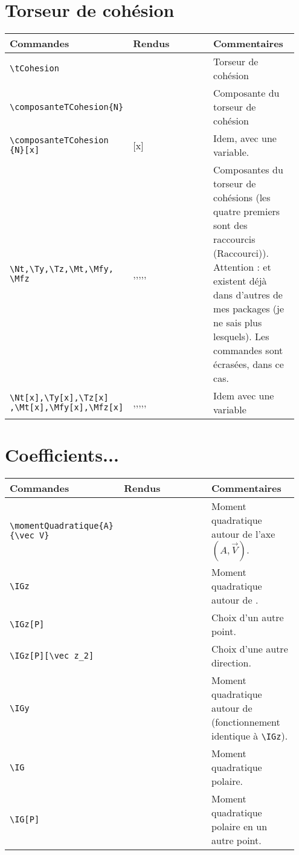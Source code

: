 \documentclass[a4paper,10pt]{article}
\newcommand{\rac}{({\color{red}Raccourci})}
\begin{document}
	\section{Torseur de cohésion}
	\noindent
	\begin{tabular}{|p{0.35\linewidth}|p{0.3\linewidth}|p{0.3\linewidth}|}
		\hline
			\textbf{Commandes}&\textbf{Rendus}&\textbf{Commentaires}
		\\\hline\hline
			\verb!\tCohesion!		&	\tCohesion		&	Torseur de cohésion
		\\\hline
			\verb!\composanteTCohesion{N}!		&	\composanteTCohesion{N}		&	Composante du torseur de cohésion
		\\\hline
			\verb!\composanteTCohesion! \verb!{N}[x]!		&	\composanteTCohesion{N}[x]		&	Idem, avec une variable.
		\\\hline
			\verb!\Nt,\Ty,\Tz,\Mt,\Mfy,! \verb!\Mfz!		&	\Nt,\Ty,\Tz,\Mt,\Mfy,\Mfz		&	Composantes du torseur de cohésions (les quatre premiers sont des raccourcis \rac). Attention : \Ty et \Tz existent déjà dans d'autres de mes packages (je ne sais plus lesquels). Les commandes sont écrasées, dans ce cas.
		\\\hline
			\verb!\Nt[x],\Ty[x],\Tz[x]! \verb!,\Mt[x],\Mfy[x],\Mfz[x]!		&	\Nt[x],\Ty[x],\Tz[x],\Mt[x],\Mfy[x],\Mfz[x]		&	Idem avec une variable
		\\\hline
	\end{tabular}


    \section{Coefficients...}
    
    \noindent
	\begin{tabular}{|p{0.35\linewidth}|p{0.3\linewidth}|p{0.3\linewidth}|}
		\hline
			\textbf{Commandes}&\textbf{Rendus}&\textbf{Commentaires}
		\\\hline\hline
			\verb!\momentQuadratique{A}! \verb!{\vec V}!		&	\momentQuadratique{A}{\vec V}		&	Moment quadratique autour de l'axe $(A,\vec V)$.
		\\\hline
			\verb!\IGz!		&	\IGz		&	Moment quadratique autour de \vz{}.
		\\\hline
			\verb!\IGz[P]!		&	\IGz[P]		&	Choix d'un autre point.
		\\\hline
			\verb!\IGz[P][\vec z_2]!		&	\IGz[P][\vec z_2]		&	Choix d'une autre direction.
		\\\hline
			\verb!\IGy!		&	\IGy		&	Moment quadratique autour de \vy{} (fonctionnement identique à \verb!\IGz!).
		\\\hline
			\verb!\IG!		&	\IG		&	Moment quadratique polaire.
		\\\hline
			\verb!\IG[P]!		&	\IG[P]		&	Moment quadratique polaire en un autre point.
		\\\hline
	\end{tabular}
\end{document}
